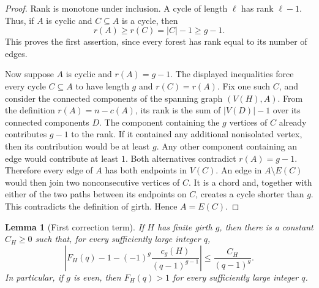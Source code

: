 \documentclass[11pt]{article}
\newtheorem{lemma}{Lemma}
\begin{document}
\begin{proof}
Rank is monotone under inclusion.  A cycle of length \(\ell\) has rank
\(\ell-1\).  Thus, if \(A\) is cyclic and \(C\subseteq A\) is a cycle,
then
\[
    r(A)\ge r(C)=|C|-1\ge g-1.
\]
This proves the first assertion, since every forest has rank equal to its
number of edges.

Now suppose \(A\) is cyclic and \(r(A)=g-1\).  The displayed inequalities
force every cycle \(C\subseteq A\) to have length \(g\) and
\(r(C)=r(A)\).  Fix one such \(C\), and consider the connected components of
the spanning graph \((V(H),A)\).  From the definition \(r(A)=n-c(A)\), its
rank is the sum of \(|V(D)|-1\) over its connected components \(D\).  The
component containing the \(g\) vertices
of \(C\) already contributes \(g-1\) to the rank.  If it contained any
additional nonisolated vertex, then its contribution would be at least \(g\).
Any other component containing an edge would contribute at least \(1\).
Both alternatives contradict \(r(A)=g-1\).  Therefore every edge of \(A\)
has both endpoints in \(V(C)\).  An edge in \(A\setminus E(C)\) would then join
two nonconsecutive vertices of \(C\).  It is a chord and, together with either
of the two paths between its endpoints on \(C\), creates a cycle shorter than
\(g\).  This contradicts the definition of girth.  Hence \(A=E(C)\).
\end{proof}

\begin{lemma}[First correction term]\label{lem:first-correction}
If \(H\) has finite girth \(g\), then there is a constant \(C_H\ge0\)
such that, for every sufficiently large integer \(q\),
\[
    \left|
      F_H(q)-1-
      (-1)^g\frac{c_g(H)}{(q-1)^{g-1}}
    \right|
    \le
    \frac{C_H}{(q-1)^g}.
\]
In particular, if \(g\) is even, then \(F_H(q)>1\) for every sufficiently
large integer \(q\).
\end{lemma}
\end{document}
